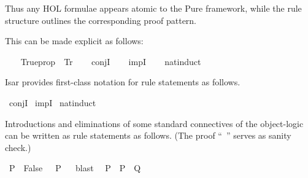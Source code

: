 \begin{isabellebody}
\begin{isamarkuptext}
  Thus any HOL formulae appears atomic to the Pure framework, while
  the rule structure outlines the corresponding proof pattern.

  This can be made explicit as follows:%
\end{isamarkuptext}%
\isamarkuptrue%
\isamarkupfalse%
\isanewline
{}\isanewline
%
\isadelimproof
\ \ %
\endisadelimproof
%
\isatagproof
{}\isamarkupfalse%
\ Trueprop\ \ {}{}Tr{}{}%
\endisatagproof
{\isafoldproof}%
%
\isadelimproof
\isanewline
%
\endisadelimproof
\isanewline
\ \ \isamarkupfalse%
\ conjI\isanewline
\ \ \isamarkupfalse%
\ impI\isanewline
\ \ \isamarkupfalse%
\ nat{}induct\isanewline
{}\isamarkupfalse%
%
\begin{isamarkuptext}%
Isar provides first-class notation for rule statements as follows.%
\end{isamarkuptext}%
\isamarkuptrue%
\isamarkupfalse%
\ conjI\isanewline
{}\isamarkupfalse%
\ impI\isanewline
{}\isamarkupfalse%
\ nat{}induct%
\isamarkuptrue%
%
\begin{isamarkuptext}%
Introductions and eliminations of some standard connectives of
  the object-logic can be written as rule statements as follows.  (The
  proof ``\hyperlink{command.by}{\mbox{}}~\hyperlink{method.blast}{\mbox{}}'' serves as sanity check.)%
\end{isamarkuptext}%
\isamarkuptrue%
\isamarkupfalse%
\ {}{}P\ {}\ False{}\ {}\ {}\ P{}%
\isadelimproof
\ %
\endisadelimproof
%
\isatagproof
{}\isamarkupfalse%
\ blast%
\endisatagproof
{\isafoldproof}%
%
\isadelimproof
%
\endisadelimproof
\isanewline
{}\isamarkupfalse%
\ {}{}\ P\ {}\ P\ {}\ Q{}%

\end{isabellebody}

